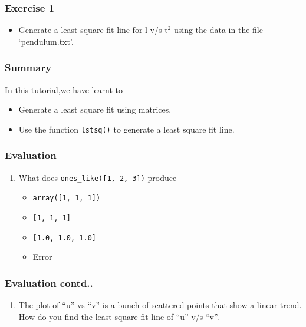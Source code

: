 \documentclass[17pt,compress]{beamer}
\newcounter{saveenumi}
\newcommand{\seti}{\setcounter{saveenumi}{\value{enumi}}}
\newcommand{\conti}{\setcounter{enumi}{\value{saveenumi}}}
\begin{document}
\begin{frame}
\frametitle{Exercise 1}
\label{sec-4}

\begin{itemize}
\item Generate a least square fit line for l v/s t$^2$ using the data in the file
    `pendulum.txt'.
\end{itemize}
\end{frame}
\begin{frame}
\frametitle{Summary}
\label{sec-5}

  In this tutorial,we have learnt to -

\begin{itemize}
\item Generate a least square fit using matrices. 
\item Use the function \texttt{lstsq()} to generate a least square fit line.
\end{itemize}
\end{frame}
\begin{frame}
\frametitle{Evaluation}
\label{sec-6.1}


\begin{enumerate}
\item What does \texttt{ones\_{like}([1, 2, 3])} produce \pause
\begin{itemize}
\item \texttt{array([1, 1, 1])}
\item \texttt{[1, 1, 1]}
\item \texttt{[1.0, 1.0, 1.0]}
\item Error
\end{itemize}
\seti
\end{enumerate}
\end{frame}
\begin{frame}
\frametitle{Evaluation contd..}
\label{sec-6.2}


\begin{enumerate}
\conti
\item The plot of ``u'' vs ``v'' is a bunch of scattered points that show a
     linear trend. How do you find the least square fit line of ``u'' v/s ``v''.
\end{enumerate}
\end{frame}
\end{document}
